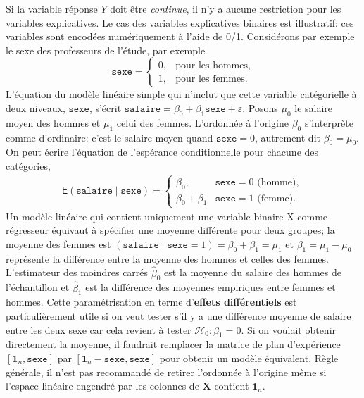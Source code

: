 \documentclass[
  11pt,
  letterpaper,
]{article}
\theoremstyle{definition}
\theoremstyle{definition}
\theoremstyle{definition}
\theoremstyle{remark}
\begin{document}
Si la variable réponse \(Y\) doit être \emph{continue}, il n'y a aucune restriction pour les variables explicatives. Le cas des variables explicatives binaires est illustratif: ces variables sont encodées numériquement à l'aide de 0/1. Considérons par exemple le sexe des professeurs de l'étude, par exemple
\[\texttt{sexe} = \begin{cases} 0 , & \text{pour les hommes},\\
1, & \text{pour les femmes.}
\end{cases}
\]
L'équation du modèle linéaire simple qui n'inclut que cette variable catégorielle à deux niveaux, \(\texttt{sexe}\), s'écrit \(\texttt{salaire} = \beta_0 + \beta_1 \texttt{sexe} + \varepsilon\). Posons \(\mu_0\) le salaire moyen des hommes et \(\mu_1\) celui des femmes. L'ordonnée à l'origine \(\beta_0\) s'interprète comme d'ordinaire: c'est le salaire moyen quand \(\texttt{sexe}=0\), autrement dit \(\beta_0=\mu_0\). On peut écrire l'équation de l'espérance conditionnelle pour chacune des catégories,
\begin{align*}
\mathsf{E}(\texttt{salaire} \mid \texttt{sexe})= \begin{cases}
\beta_0, & \texttt{sexe}=0 \text{ (homme)}, \\
\beta_0 + \beta_1 & \texttt{sexe}=1 \text{ (femme)}.
\end{cases}
\end{align*}
Un modèle linéaire qui contient uniquement une variable binaire \(\mathrm{X}\) comme régresseur équivaut à spécifier une moyenne différente pour deux groupes; la moyenne des femmes est \(\mathsf{}(\texttt{salaire} \mid \texttt{sexe}=1) = \beta_0 + \beta_1 = \mu_1\) et \(\beta_1=\mu_1-\mu_0\) représente la différence entre la moyenne des hommes et celles des femmes. L'estimateur des moindres carrés \(\widehat{\beta}_0\) est la moyenne du salaire des hommes de l'échantillon et \(\widehat{\beta}_1\) est la différence des moyennes empiriques entre femmes et hommes. Cette paramétrisation en terme d'\textbf{effets différentiels} est particulièrement utile si on veut tester s'il y a une différence moyenne de salaire entre les deux sexe car cela revient à tester \(\mathscr{H}_0: \beta_1=0\). Si on voulait obtenir directement la moyenne, il faudrait remplacer la matrice de plan d'expérience \([\mathbf{1}_n, \texttt{sexe}]\) par \([\mathbf{1}_n- \texttt{sexe}, \texttt{sexe}]\) pour obtenir un modèle équivalent. Règle générale, il n'est pas recommandé de retirer l'ordonnée à l'origine même si l'espace linéaire engendré par les colonnes de \(\mathbf{X}\) contient \(\mathbf{1}_n\).
\end{document}
